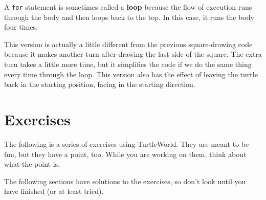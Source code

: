 \documentclass[10pt]{book}
\begin{document}

A {\tt for} statement is sometimes called a {\bf loop} because
the flow of execution runs through the body and then loops back
to the top.  In this case, it runs the body four times.

This version is actually a little different from the previous
square-drawing code because it makes another turn after
drawing the last side of the square.  The extra turn takes a little
more time, but it simplifies the code if we do the same thing
every time through the loop.  This version also has the effect
of leaving the turtle back in the starting position, facing in
the starting direction.

\section{Exercises}

The following is a series of exercises using TurtleWorld.  They
are meant to be fun, but they have a point, too.  While you are
working on them, think about what the point is.

The following sections have solutions to the exercises, so
don't look until you have finished (or at least tried).
\end{document}

